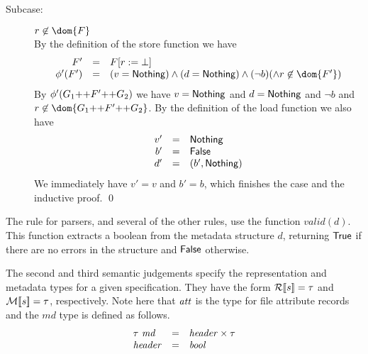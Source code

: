 {\begin{description}
\begin{description}
\item[Subcase:] $r \not\in \dom{F}$\\[1ex]
%
By the definition of the store function we have
\[
\begin{array}{rcll}
F' &=& \FDelete{F}{r}\\
\phi'(F') &=& (v = \Nothing) \wedge (d = \Nothing) \wedge (\neg b) (\wedge r \not\in \dom{F'})
\end{array}
\]
By $\phi'(G_1 \text{++} F' \text{++} G_2)$ we have $v = \mathsf{Nothing}$ and $d
= \mathsf{Nothing}$ and $\neg b$ and $r \not\in \dom{G_1 \FAppend F' \FAppend
  G_2}$.
%
By the definition of the load function we also have 
\[ 
\begin{array}{rcll}
v' &=& \mathsf{Nothing}\\
b' &=& \mathsf{False}\\
d' &=& (b',\mathsf{Nothing})\\
\end{array}
\]
%
We immediately have $v' = v$ and $b' = b$, which finishes the case and
the inductive proof. \hfill \qed
\end{description}
\end{description}}


The rule for \padshaskell{} parsers, and several of the other rules,
use the function $valid(d)$.  This function extracts a boolean from
the metadata structure $d$, returning $\mathsf{True}$ if there are no errors
in the structure and $\mathsf{False}$ otherwise.

The second and third semantic judgements specify the representation
and metadata types for a given specification.  They have the form
${\cal R}[\![ s ]\!] = \tau$ and ${\cal M}[\![ s ]\!] = \tau$, respectively.  Note here
that $\mathit{att}$ is the type for file attribute records and the 
$md$ type is defined as follows.
\[
\begin{array}{lcl}
\tau~\mathit{md} & = & \mathit{header} \times \tau \\
\mathit{header} & = & \mathit{bool} 
\end{array}
\]

